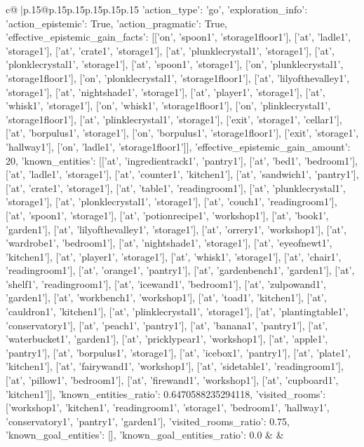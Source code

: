 \documentclass{article}
\begin{document}
{\begin{supertabular}{c@{$\;$}|p{.15\linewidth}@{}p{.15\linewidth}p{.15\linewidth}p{.15\linewidth}p{.15\linewidth}p{.15\linewidth}}
{{{	 {'action_type': 'go', 'exploration_info': {'action_epistemic': True, 'action_pragmatic': True, 'effective_epistemic_gain_facts': [['on', 'spoon1', 'storage1floor1'], ['at', 'ladle1', 'storage1'], ['at', 'crate1', 'storage1'], ['at', 'plunklecrystal1', 'storage1'], ['at', 'plonklecrystal1', 'storage1'], ['at', 'spoon1', 'storage1'], ['on', 'plunklecrystal1', 'storage1floor1'], ['on', 'plonklecrystal1', 'storage1floor1'], ['at', 'lilyofthevalley1', 'storage1'], ['at', 'nightshade1', 'storage1'], ['at', 'player1', 'storage1'], ['at', 'whisk1', 'storage1'], ['on', 'whisk1', 'storage1floor1'], ['on', 'plinklecrystal1', 'storage1floor1'], ['at', 'plinklecrystal1', 'storage1'], ['exit', 'storage1', 'cellar1'], ['at', 'borpulus1', 'storage1'], ['on', 'borpulus1', 'storage1floor1'], ['exit', 'storage1', 'hallway1'], ['on', 'ladle1', 'storage1floor1']], 'effective_epistemic_gain_amount': 20, 'known_entities': [['at', 'ingredientrack1', 'pantry1'], ['at', 'bed1', 'bedroom1'], ['at', 'ladle1', 'storage1'], ['at', 'counter1', 'kitchen1'], ['at', 'sandwich1', 'pantry1'], ['at', 'crate1', 'storage1'], ['at', 'table1', 'readingroom1'], ['at', 'plunklecrystal1', 'storage1'], ['at', 'plonklecrystal1', 'storage1'], ['at', 'couch1', 'readingroom1'], ['at', 'spoon1', 'storage1'], ['at', 'potionrecipe1', 'workshop1'], ['at', 'book1', 'garden1'], ['at', 'lilyofthevalley1', 'storage1'], ['at', 'orrery1', 'workshop1'], ['at', 'wardrobe1', 'bedroom1'], ['at', 'nightshade1', 'storage1'], ['at', 'eyeofnewt1', 'kitchen1'], ['at', 'player1', 'storage1'], ['at', 'whisk1', 'storage1'], ['at', 'chair1', 'readingroom1'], ['at', 'orange1', 'pantry1'], ['at', 'gardenbench1', 'garden1'], ['at', 'shelf1', 'readingroom1'], ['at', 'icewand1', 'bedroom1'], ['at', 'zulpowand1', 'garden1'], ['at', 'workbench1', 'workshop1'], ['at', 'toad1', 'kitchen1'], ['at', 'cauldron1', 'kitchen1'], ['at', 'plinklecrystal1', 'storage1'], ['at', 'plantingtable1', 'conservatory1'], ['at', 'peach1', 'pantry1'], ['at', 'banana1', 'pantry1'], ['at', 'waterbucket1', 'garden1'], ['at', 'pricklypear1', 'workshop1'], ['at', 'apple1', 'pantry1'], ['at', 'borpulus1', 'storage1'], ['at', 'icebox1', 'pantry1'], ['at', 'plate1', 'kitchen1'], ['at', 'fairywand1', 'workshop1'], ['at', 'sidetable1', 'readingroom1'], ['at', 'pillow1', 'bedroom1'], ['at', 'firewand1', 'workshop1'], ['at', 'cupboard1', 'kitchen1']], 'known_entities_ratio': 0.6470588235294118, 'visited_rooms': ['workshop1', 'kitchen1', 'readingroom1', 'storage1', 'bedroom1', 'hallway1', 'conservatory1', 'pantry1', 'garden1'], 'visited_rooms_ratio': 0.75, 'known_goal_entities': [], 'known_goal_entities_ratio': 0.0}} 
	  } 
	   } 
	   } 
	 & & \\ 
 


\end{supertabular}}
\end{document}

